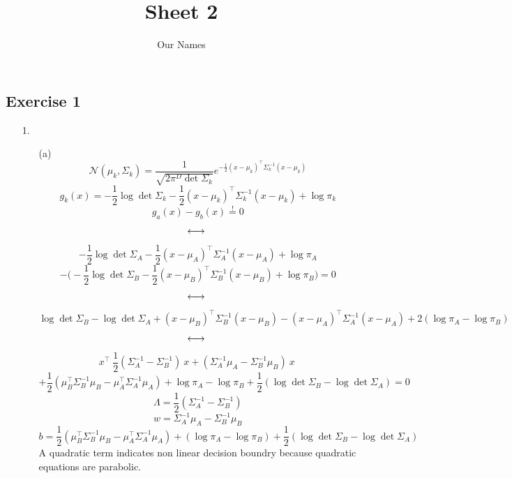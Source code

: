 \documentclass[12pt]{article}
\title{ Sheet 2 }
\author{Our Names}
\begin{document}
\maketitle

\vspace{0.5in}



\subsection*{Exercise 1}
\begin{itemize}

\item[1.] 
\begin{itemize}
\item[(a)] \[
\mathcal{N}(\mu_{k},\Sigma_{k}) = \frac{1}{\sqrt{2\pi^{D} \det{\Sigma_k}}}e^{ -\frac{1}{2}(x-\mu_k)^\intercal \Sigma_k^{-1} (x-\mu_k)}
\]
\vspace{1cm} %
\[
g_k(x) = -\frac{1}{2} \log{\det{\Sigma_k}} - \frac{1}{2} (x-\mu_k)^\intercal \Sigma_k^{-1} (x-\mu_k) + \log \pi_k
\]
\vspace{1cm} %
\[
g_a(x) - g_b(x) \overset{!}{=} 0
\]
$$\longleftrightarrow\\$$
\[
-\frac{1}{2} \log{\det{\Sigma_A}} - \frac{1}{2} (x-\mu_A)^\intercal \Sigma_A^{-1} (x-\mu_A) + \log \pi_A
\]
\[ 
-\bigg( -\frac{1}{2} \log{\det{\Sigma_B}} - \frac{1}{2} (x-\mu_B)^\intercal \Sigma_B^{-1} (x-\mu_B) + \log \pi_B \bigg) = 0
\]
$$\longleftrightarrow\\$$
\[
\log{\det{\Sigma_B}}-\log{\det{\Sigma_A}}+(x-\mu_B)^\intercal\Sigma_B^{-1}(x-\mu_B)-(x-\mu_A)^\intercal\Sigma_A^{-1}(x-\mu_A)+2(\log{\pi_A}-\log{\pi_B})
\]
$$\longleftrightarrow\\$$
\[
x^\intercal\ \frac{1}{2} (\Sigma_A^{-1} - \Sigma_B^{-1})\ x + (\Sigma_A^{-1}\mu_A - \Sigma_B^{-1}\mu_B)\ x\ \]\[+\frac{1}{2} (\mu_B^\intercal \Sigma_B^{-1} \mu_B-\mu_A^\intercal \Sigma_A^{-1} \mu_A) + \log{{\pi_A}-\log{\pi_B}} + \frac{1}{2}(\log{\det\Sigma_B}-\log{\det\Sigma_A}) = 0
\]
\vspace{1cm} %
\[\Lambda = \frac{1}{2} (\Sigma_A^{-1} - \Sigma_B^{-1})\]
\[w = \Sigma_A^{-1}\mu_A - \Sigma_B^{-1}\mu_B\]
\[b = \frac{1}{2} (\mu_B^\intercal \Sigma_B^{-1} \mu_B-\mu_A^\intercal \Sigma_A^{-1} \mu_A) + (\log{\pi_A}-\log{\pi_B}) + \frac{1}{2}(\log{\det\Sigma_B}-\log{\det\Sigma_A})\]
A quadratic term indicates non linear decision boundry because quadratic equations are parabolic.
\vspace{1cm}

\end{itemize}
\end{itemize}
\end{document}
